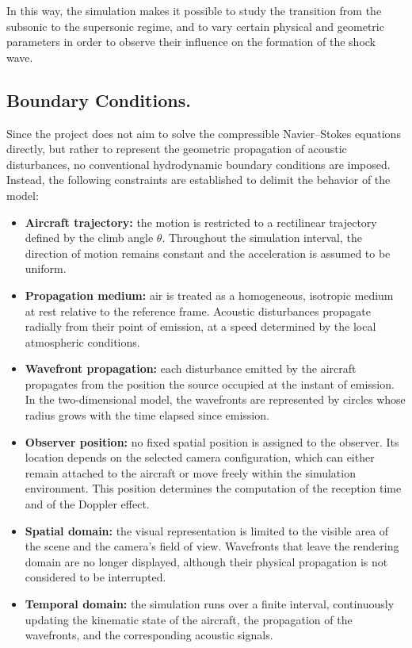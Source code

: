 \documentclass[10.5pt]{article}
\begin{document}
	In this way, the simulation makes it possible to study the transition from the subsonic to the supersonic regime, and to vary certain physical and geometric parameters in order to observe their influence on the formation of the shock wave.
	
	\subsection{Boundary Conditions.}
	
	Since the project does not aim to solve the compressible Navier--Stokes equations directly, but rather to represent the geometric propagation of acoustic disturbances, no conventional hydrodynamic boundary conditions are imposed. Instead, the following constraints are established to delimit the behavior of the model:
	
	\begin{itemize}
		
		\item \textbf{Aircraft trajectory:} the motion is restricted to a rectilinear trajectory defined by the climb angle $\theta$. Throughout the simulation interval, the direction of motion remains constant and the acceleration is assumed to be uniform.
		
		\item \textbf{Propagation medium:} air is treated as a homogeneous, isotropic medium at rest relative to the reference frame. Acoustic disturbances propagate radially from their point of emission, at a speed determined by the local atmospheric conditions.
		
		\item \textbf{Wavefront propagation:} each disturbance emitted by the aircraft propagates from the position the source occupied at the instant of emission. In the two-dimensional model, the wavefronts are represented by circles whose radius grows with the time elapsed since emission.
		
		\item \textbf{Observer position:} no fixed spatial position is assigned to the observer. Its location depends on the selected camera configuration, which can either remain attached to the aircraft or move freely within the simulation environment. This position determines the computation of the reception time and of the Doppler effect.
		
		\item \textbf{Spatial domain:} the visual representation is limited to the visible area of the scene and the camera's field of view. Wavefronts that leave the rendering domain are no longer displayed, although their physical propagation is not considered to be interrupted.
		
		\item \textbf{Temporal domain:} the simulation runs over a finite interval, continuously updating the kinematic state of the aircraft, the propagation of the wavefronts, and the corresponding acoustic signals.
		
	\end{itemize}
	
\end{document}

